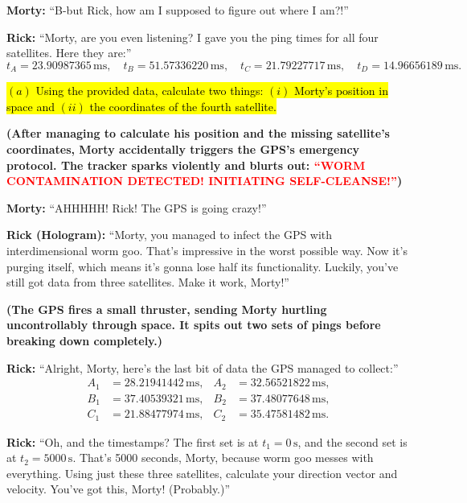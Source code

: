 \documentclass[a4paper, 12pt]{exam}
\begin{document}
\bigskip
\noindent \textbf{Morty:} “B-but Rick, how am I supposed to figure out where I am?!” \bigskip

\noindent \textbf{Rick:} “Morty, are you even listening? I gave you the ping times for all four satellites. Here they are:”
\[
t_A = 23.90987365 \, \text{ms}, \quad t_B = 51.57336220 \, \text{ms}, \quad t_C = 21.79227717 \, \text{ms}, \quad t_D = 14.96656189 \, \text{ms}.
\]

\hl{$(a)$ Using the provided data, calculate two things: $(i)$ Morty's position in space and $(ii)$ the coordinates of the fourth satellite.}

\bigskip

\noindent \textbf{(After managing to calculate his position and the missing satellite’s coordinates, Morty accidentally triggers the GPS’s emergency protocol. The tracker sparks violently and blurts out: \textcolor{red}{“WORM CONTAMINATION DETECTED! INITIATING SELF-CLEANSE!”})}

\bigskip

\noindent \textbf{Morty:} “AHHHHH! Rick! The GPS is going crazy!” 

\bigskip

\noindent \textbf{Rick (Hologram):} “Morty, you managed to infect the GPS with interdimensional worm goo. That’s impressive in the worst possible way. Now it’s purging itself, which means it’s gonna lose half its functionality. Luckily, you’ve still got data from three satellites. Make it work, Morty!” 

\bigskip

\noindent \textbf{(The GPS fires a small thruster, sending Morty hurtling uncontrollably through space. It spits out two sets of pings before breaking down completely.)}

\bigskip

\noindent \textbf{Rick:} “Alright, Morty, here’s the last bit of data the GPS managed to collect:”
\[
\begin{aligned}
A_1 &= 28.21941442 \, \text{ms}, & A_2 &= 32.56521822 \, \text{ms}, \\
B_1 &= 37.40539321 \, \text{ms}, & B_2 &= 37.48077648 \, \text{ms}, \\
C_1 &= 21.88477974 \, \text{ms}, & C_2 &= 35.47581482 \, \text{ms}.
\end{aligned}
\]

\noindent \textbf{Rick:} “Oh, and the timestamps? The first set is at \(t_1 = 0 \, \text{s}\), and the second set is at \(t_2 = 5000 \, \text{s}\). That’s 5000 seconds, Morty, because worm goo messes with everything. Using just these three satellites, calculate your direction vector and velocity. You’ve got this, Morty! (Probably.)”
\end{document}

